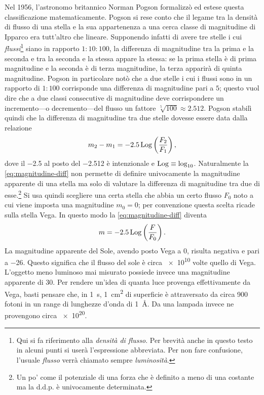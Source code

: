         Nel 1956, l'astronomo britannico Norman Pogson formalizzò ed estese questa classificazione matematicamente. Pogson si rese conto che il legame tra la densità di flusso di una stella e la sua appartenenza a una cerca classe di magnitudine di Ipparco era tutt'altro che lineare. Supponendo infatti di avere tre stelle i cui \emph{flussi}\footnote{Qui si fa riferimento alla \emph{densità di flusso}. Per brevità anche in questo testo in alcuni punti si userà l'espressione abbreviata. Per non fare confusione, l'usuale \emph{flusso} verrà chiamato sempre \emph{luminosità}.} siano in rapporto $1:10:100$, la differenza di magnitudine tra la prima e la seconda e tra la seconda e la stessa appare la stessa: se la prima stella è di prima magnitudine e la seconda è di terza magnitudine, la terza apparirà di quinta magnitudine. Pogson in particolare notò che a due stelle i cui i flussi sono in un rapporto di $1:100$ corrisponde una differenza di magnitudine pari a $5$; questo vuol dire che a due classi consecutive di magnitudine deve corrispondere un incremento---o decremento---del flusso un fattore $\sqrt[5]{100} \approx \num{2,512}$. Pogson stabilì quindi che la differenza di magnitudine tra due stelle dovesse essere data dalla relazione
        \begin{equation}
            \label{eq:magnitudine-diff}
            m_{2} - m_{1} = -2.5 \Log{\pqty{\frac{F_{2}}{F_{1}}}}
            \mycomma
        \end{equation}
        dove il \num{-2.5} al posto del \num{-2,512} è intenzionale e $\operatorname{Log} \equiv \log_
        {10}$. Naturalmente la \eqref{eq:magnitudine-diff} non permette di definire univocamente la magnitudine apparente di una stella ma solo di valutare la differenza di magnitudine tra due di esse.\footnote{Un po' come il potenziale di una forza che è definito a meno di una costante ma la d.d.p. è univocamente determinata.} Si usa quindi scegliere una certa stella che abbia un certo flusso $F_{0}$ noto a cui viene imposta una magnitudine $m_{0} = 0$; per convenzione questa scelta ricade sulla stella Vega. In questo modo la \eqref{eq:magnitudine-diff} diventa
        \begin{equation}
            \label{magnitudine-app}
            m = -2.5 \Log{\pqty{\frac{F}{F_{0}}}}
            \myperiod
        \end{equation}
        La magnitudine apparente del Sole, avendo posto Vega a $0$, risulta negativa e pari a \num{-26}. Questo significa che il flusso del sole è circa \num{e10} volte quello di Vega. L'oggetto meno luminoso mai misurato possiede invece una magnitudine apparente di \num{30}. Per rendere un'idea di quanta luce provenga effettivamente da Vega, basti pensare che, in \SI{1}{s}, \SI{1}{cm^2} di superficie è attraversato da circa \num{900} fotoni in un range di lunghezze d'onda di \SI{1}{\angstrom}. Da una lampada invece ne provengono circa \num{e20}.

